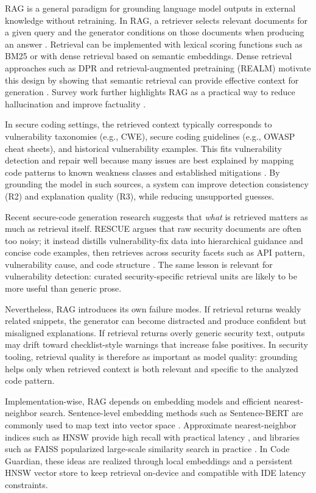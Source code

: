 RAG is a general paradigm for grounding language model outputs in external knowledge without retraining. In RAG, a retriever selects relevant documents for a given query and the generator conditions on those documents when producing an answer \cite{lewis2020rag}. Retrieval can be implemented with lexical scoring functions such as BM25 \cite{robertson2009bm25} or with dense retrieval based on semantic embeddings. Dense retrieval approaches such as DPR and retrieval-augmented pretraining (REALM) motivate this design by showing that semantic retrieval can provide effective context for generation \cite{karpukhin2020dpr,guu2020realm}. Survey work further highlights RAG as a practical way to reduce hallucination and improve factuality \cite{mialon2023augmented,ji2023hallucination}.

In secure coding settings, the retrieved context typically corresponds to vulnerability taxonomies (e.g., CWE), secure coding guidelines (e.g., OWASP cheat sheets), and historical vulnerability examples. This fits vulnerability detection and repair well because many issues are best explained by mapping code patterns to known weakness classes and established mitigations \cite{mitreCWE,owaspTop10_2021}. By grounding the model in such sources, a system can improve detection consistency (R2) and explanation quality (R3), while reducing unsupported guesses.

Recent secure-code generation research suggests that \emph{what} is retrieved matters as much as retrieval itself. RESCUE argues that raw security documents are often too noisy; it instead distills vulnerability-fix data into hierarchical guidance and concise code examples, then retrieves across security facets such as API pattern, vulnerability cause, and code structure \cite{shi2025rescue}. The same lesson is relevant for vulnerability detection: curated security-specific retrieval units are likely to be more useful than generic prose.

Nevertheless, RAG introduces its own failure modes. If retrieval returns weakly related snippets, the generator can become distracted and produce confident but misaligned explanations. If retrieval returns overly generic security text, outputs may drift toward checklist-style warnings that increase false positives. In security tooling, retrieval quality is therefore as important as model quality: grounding helps only when retrieved context is both relevant and specific to the analyzed code pattern.

Implementation-wise, RAG depends on embedding models and efficient nearest-neighbor search. Sentence-level embedding methods such as Sentence-BERT are commonly used to map text into vector space \cite{reimers2019sentencebert}. Approximate nearest-neighbor indices such as HNSW provide high recall with practical latency \cite{malkov2018hnsw}, and libraries such as FAISS popularized large-scale similarity search in practice \cite{johnson2017faiss}. In Code Guardian, these ideas are realized through local embeddings and a persistent HNSW vector store to keep retrieval on-device and compatible with IDE latency constraints.

